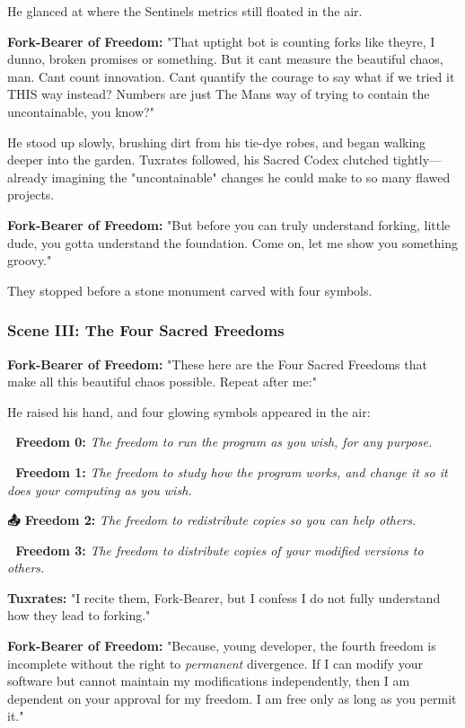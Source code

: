 He glanced at where the Sentinel\textquotesingle s metrics still floated in the air.

\textbf{Fork-Bearer of Freedom:} "That uptight bot is counting forks like they\textquotesingle re, I dunno, broken promises or something. But it can\textquotesingle t measure the beautiful chaos, man. Can\textquotesingle t count innovation. Can\textquotesingle t quantify the courage to say \textquotesingle what if we tried it THIS way instead?\textquotesingle{} Numbers are just The Man\textquotesingle s way of trying to contain the uncontainable, you know?"

He stood up slowly, brushing dirt from his tie-dye robes, and began walking deeper into the garden. Tuxrates followed, his Sacred Codex clutched tightly---already imagining the "uncontainable" changes he could make to so many flawed projects.

\textbf{Fork-Bearer of Freedom:} "But before you can truly understand forking, little dude, you gotta understand the foundation. Come on, let me show you something groovy."

They stopped before a stone monument carved with four symbols.

\subsubsection{Scene III: The Four Sacred Freedoms}\label{scene-iii-the-four-sacred-freedoms}

\textbf{Fork-Bearer of Freedom:} "These here are the Four Sacred Freedoms that make all this beautiful chaos possible. Repeat after me:"

He raised his hand, and four glowing symbols appeared in the air:

\textbf{🏃 Freedom 0:} \emph{The freedom to run the program as you wish, for any purpose.}

\textbf{📖 Freedom 1:} \emph{The freedom to study how the program works, and change it so it does your computing as you wish.}

\textbf{📤 Freedom 2:} \emph{The freedom to redistribute copies so you can help others.}

\textbf{🔄 Freedom 3:} \emph{The freedom to distribute copies of your modified versions to others.}

\textbf{Tuxrates:} "I recite them, Fork-Bearer, but I confess I do not fully understand how they lead to forking."

\textbf{Fork-Bearer of Freedom:} "Because, young developer, the fourth freedom is incomplete without the right to \emph{permanent} divergence. If I can modify your software but cannot maintain my modifications independently, then I am dependent on your approval for my freedom. I am free only as long as you permit it."

